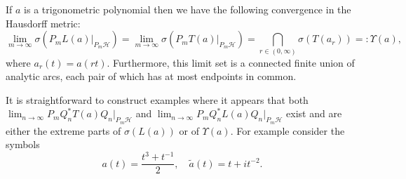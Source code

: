 \documentclass[a4paper,10pt]{article}
\begin{document}
\begin{example}
\begin{theorem}
\label{nice_teop}
If $a$ is a trigonometric polynomial then we have the following convergence in the Hausdorff metric:
$$
\lim_{m\rightarrow\infty} \sigma(P_mL(a)|_{P_m\mathcal{H}})=\lim_{m\rightarrow\infty} \sigma(P_mT(a)|_{P_m\mathcal{H}})=\bigcap_{r\in(0,\infty)}\sigma(T(a_r))=:\Upsilon(a),
$$
where $a_r(t)=a(rt)$. Furthermore, this limit set is a connected finite union of analytic arcs, each pair of which has at most endpoints in common.
\end{theorem}

It is straightforward to construct examples where it appears that both $\lim_{n\rightarrow\infty}P_mQ_n^*T(a)Q_n|_{P_m\mathcal{H}}$ and $\lim_{n\rightarrow\infty}P_mQ_n^*L(a)Q_n|_{P_m\mathcal{H}}$ exist and are either the extreme parts of $\sigma(L(a))$ or of $\Upsilon(a)$. For example consider the symbols
$$a(t)=\frac{t^3+t^{-1}}{2},\quad \tilde{a}(t)=t+it^{-2}.$$

\end{example}
\end{document}
